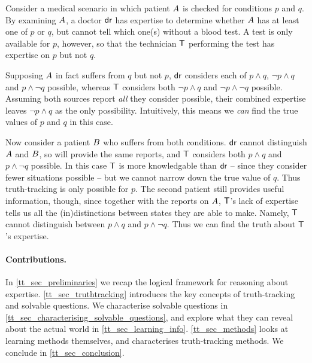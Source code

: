 \begin{example}
    \label{tt_ex_informal_example}

    Consider a medical scenario in which patient $A{}$ is checked for
    conditions $p$ and $q$. By examining $A{}$, a doctor
    $\mathsf{dr}{}$ has expertise to determine whether $A{}$ has at least one
    of $p$ or $q$, but cannot tell which one(s) without a blood test. A test is
    only available for $p$, however, so that the technician $\mathsf{T}{}$
    performing the test has expertise on $p$ but not $q$.

    Supposing $A{}$ in fact suffers from $q$ but not $p$, $\mathsf{dr}{}$
    considers each of $p \land q$, $\neg p \land q$ and $p \land \neg q$
    possible, whereas $\mathsf{T}{}$ considers both $\neg p \land q$ and $\neg p
    \land \neg q$ possible.
    Assuming both sources report \emph{all} they consider possible, their
    combined expertise leaves $\neg p \land q$ as the only
    possibility. Intuitively, this means we \emph{can} find the true values of
    $p$ and $q$ in this case.

    Now consider a patient $B{}$ who suffers from both conditions.
    $\mathsf{dr}{}$ cannot distinguish $A{}$ and $B{}$, so will provide
    the same reports, and $\mathsf{T}{}$ considers both $p \land q$ and $p \land
    \neg q$ possible. In this case $\mathsf{T}{}$ is more knowledgable than $\mathsf{dr}{}$
    -- since they consider fewer situations possible -- but we cannot narrow
    down the true value of $q$. Thus truth-tracking is only possible for $p$.
    The second patient still provides useful information, though, since
    together with the reports on $A{}$,
    $\mathsf{T}{}$'s lack of expertise tells us all the (in)distinctions between
    states they are able to make. Namely, $\mathsf{T}{}$ cannot distinguish between
    $p \land q$ and $p \land \neg q$. Thus we can find the truth about
    $\mathsf{T}{}$'s expertise.

\end{example}

\paragraph{Contributions.} 

\begin{chapteroutline}
    In \cref{tt_sec_preliminaries} we recap the logical framework for reasoning
    about expertise. \cref{tt_sec_truthtracking} introduces the key concepts of
    truth-tracking and solvable questions. We characterise solvable questions in
    \cref{tt_sec_characterising_solvable_questions}, and explore what they can reveal
    about the actual world in \cref{tt_sec_learning_info}. \cref{tt_sec_methods} looks at
    learning methods themselves, and characterises truth-tracking methods. We
    conclude in \cref{tt_sec_conclusion}.
\end{chapteroutline}

